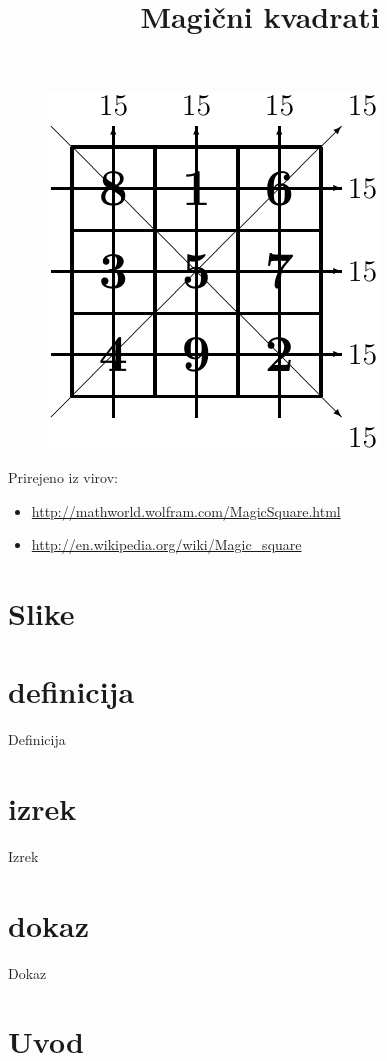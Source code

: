 \documentclass[a4paper,12pt]{article}
\title{Magični kvadrati}
\date{}
\begin{document}
\maketitle
\begin{figure}[!ht]
   \centering
   \includegraphics{slika.pdf}
\end{figure}

Prirejeno iz virov:

\begin{itemize}
   \item \url{http://mathworld.wolfram.com/MagicSquare.html}
   \item \url{http://en.wikipedia.org/wiki/Magic_square}
\end{itemize}

\tableofcontents

\section{Slike}
\label{sec:slike}
\section{definicija}
Definicija
\section{izrek}
Izrek
\section{dokaz}
Dokaz

\newpage

\section{Uvod}
\end{document}
